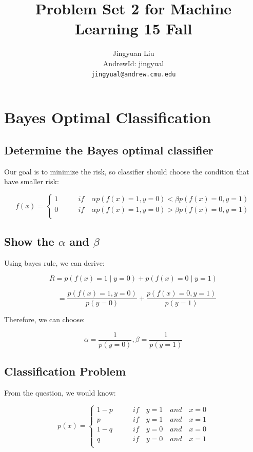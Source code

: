 \documentclass{article} %
\title{Problem Set 2 for Machine Learning 15 Fall}
\author{
Jingyuan Liu\\
AndrewId: jingyual\\
\texttt{jingyual@andrew.cmu.edu} \\
}
\begin{document}
\maketitle



\section{Bayes Optimal Classification}


\subsection{Determine the Bayes optimal classifier}
Our goal is to minimize the risk, so classifier should choose the
condition that have smaller risk:

\[ f(x) =
    \begin{cases}
        1 & \qquad if \quad \alpha p(f(x)=1,y=0) < \beta p(f(x)=0,y=1) \\
        0 & \qquad if \quad \alpha p(f(x)=1,y=0) > \beta p(f(x)=0,y=1) \\
    \end{cases}
\]


\subsection{Show the $\alpha$ and $\beta$}
Using bayes rule, we can derive:

\begin{equation}
R = p(f(x) = 1 \mid y = 0) + p(f(x) = 0 \mid y = 1)
\end{equation}

\begin{equation}
\quad = \frac{p(f(x)=1, y=0)}{p(y=0)} + \frac{p(f(x)=0, y=1)}{p(y=1)}
\end{equation}

Therefore, we can choose:

\begin{equation}
\alpha = \frac{1}{p(y=0)}, \beta = \frac{1}{p(y=1)}
\end{equation}


\subsection{Classification Problem}
From the question, we would know:

\[ p(x) =
    \begin{cases}
        1-p & \qquad if \quad y = 1 \quad and \quad x = 0\\
        p   & \qquad if \quad y = 1 \quad and \quad x = 1 \\
        1-q & \qquad if \quad y = 0 \quad and \quad x = 0 \\
        q   & \qquad if \quad y = 0 \quad and \quad x = 1 \\
    \end{cases}
\]
\end{document}
